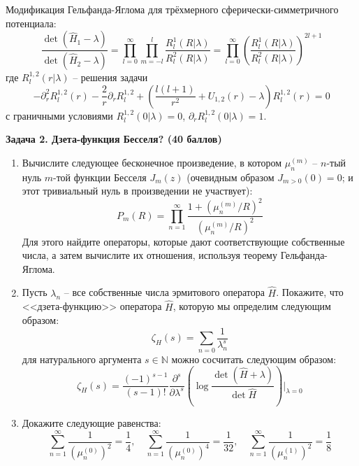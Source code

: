 \documentclass[12pt]{article}
\theoremstyle{definition}
\begin{document}
\begin{enumerate}
\begin{equation}
    \end{equation}
    Модификация Гельфанда-Яглома для трёхмерного сферически-симметричного потенциала:
    \begin{equation}
        \boxed{\frac{\det(\hat{H}_1-\lambda)}{\det(\hat{H}_2-\lambda)}=\prod\limits_{l=0}^\infty\prod\limits_{m=-l}^l\frac{R^1_l(R|\lambda)}{R^2_l(R|\lambda)}=\prod\limits_{l=0}^\infty\left(\frac{R^1_l(R|\lambda)}{R^2_l(R|\lambda)}\right)^{2l+1}}
    \end{equation}
    где $R^{1,2}_l(r|\lambda)$ -- решения задачи
    \begin{equation}
        -\partial^2_rR^{1,2}_l(r)-\frac{2}{r}\partial_rR^{1,2}_l+\left(\frac{l(l+1)}{r^2}+U_{1,2}(r)-\lambda\right)R^{1,2}_l(r)=0
    \end{equation}
    с граничными условиями $R^{1,2}_l(0|\lambda)=0$, $\partial_rR^{1,2}_l(0|\lambda)=1$.
\end{enumerate}
\textbf{Задача 2. Дзета-функция Бесселя? (40 баллов)}
\begin{enumerate}
    \item Вычислите следующее бесконечное произведение, в котором $\mu^{(m)}_n$ -- $n$-тый нуль $m$-той функции Бесселя $J_m(z)$ (очевидным образом $J_{m>0}(0) = 0$; и этот тривиальный нуль в произведении не участвует):
    \begin{equation}
        P_m(R)=\prod\limits_{n=1}^\infty\frac{1+(\mu^{(m)}_n/R)^2}{(\mu^{(m)}_n/R)^2}
    \end{equation}
    Для этого найдите операторы, которые дают соответствующие собственные числа, а затем вычислите их отношения, используя теорему Гельфанда-Яглома.
    \item Пусть $\lambda_n$ -- все собственные числа эрмитового оператора $\hat{H}$. Покажите, что <<дзета-функцию>> оператора $\hat{H}$, которую мы определим следующим образом:
    \begin{equation}
        \zeta_H(s)=\sum\limits_{n=0}\frac{1}{\lambda_n^s}
    \end{equation}
    для натурального аргумента $s\in\mathbb{N}$ можно сосчитать следующим образом:
    \begin{equation}
        \zeta_H(s)=\frac{(-1)^{s-1}}{(s-1)!}\frac{\partial^s}{\partial\lambda^s}\left(\log\frac{\det(\hat{H}+\lambda)}{\det{\hat{H}}}\right)\bigg|_{\lambda=0}
    \end{equation}
    \item Докажите следующие равенства:
    \begin{equation}
        \sum\limits_{n=1}^\infty\frac{1}{(\mu^{(0)}_n)^2}=\frac{1}{4},\quad\sum\limits_{n=1}^\infty\frac{1}{(\mu^{(0)}_n)^4}=\frac{1}{32},\quad\sum\limits_{n=1}^\infty\frac{1}{(\mu^{(1)}_n)^2}=\frac{1}{8}
    \end{equation}
\end{enumerate}
\end{document}
